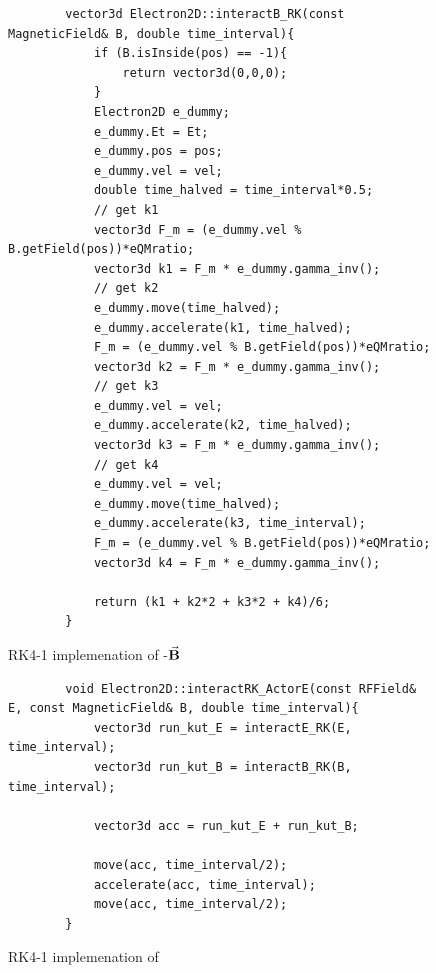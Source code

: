 \documentclass{book}
\begin{document}
\begin{figure}[H]
    \centering
    \captionsetup{justification=centering}
    \begin{verbatim}
        vector3d Electron2D::interactB_RK(const MagneticField& B, double time_interval){
            if (B.isInside(pos) == -1){
                return vector3d(0,0,0);
            }
            Electron2D e_dummy;
            e_dummy.Et = Et;
            e_dummy.pos = pos;
            e_dummy.vel = vel;
            double time_halved = time_interval*0.5;
            // get k1                                       
            vector3d F_m = (e_dummy.vel % B.getField(pos))*eQMratio;                                       
            vector3d k1 = F_m * e_dummy.gamma_inv();     
            // get k2
            e_dummy.move(time_halved);
            e_dummy.accelerate(k1, time_halved);                                              
            F_m = (e_dummy.vel % B.getField(pos))*eQMratio;                                               
            vector3d k2 = F_m * e_dummy.gamma_inv();    
            // get k3
            e_dummy.vel = vel;
            e_dummy.accelerate(k2, time_halved);
            vector3d k3 = F_m * e_dummy.gamma_inv();   
            // get k4
            e_dummy.vel = vel;
            e_dummy.move(time_halved);
            e_dummy.accelerate(k3, time_interval);                                           
            F_m = (e_dummy.vel % B.getField(pos))*eQMratio;  
            vector3d k4 = F_m * e_dummy.gamma_inv();
        
            return (k1 + k2*2 + k3*2 + k4)/6;
        }
    \end{verbatim}
\caption{RK4-1 implemenation of \e-$\vec{\textbf{B}}$}
\label{fig:rk1_B}
\end{figure}
\begin{figure}[H]
    \centering
    \captionsetup{justification=centering}
    \begin{verbatim}
        void Electron2D::interactRK_ActorE(const RFField& E, const MagneticField& B, double time_interval){
            vector3d run_kut_E = interactE_RK(E, time_interval);
            vector3d run_kut_B = interactB_RK(B, time_interval);
        
            vector3d acc = run_kut_E + run_kut_B;
            
            move(acc, time_interval/2);
            accelerate(acc, time_interval);
            move(acc, time_interval/2);
        }
    \end{verbatim}
\caption{RK4-1 implemenation of \eEM}
\label{fig:rk1_EM}
\end{figure}
\end{document}
